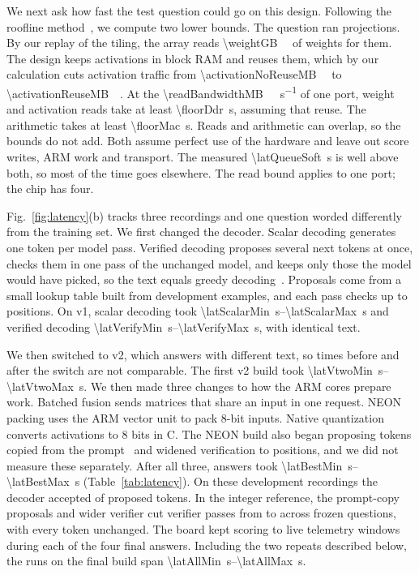 \documentclass[conference,10pt,letterpaper]{IEEEtran}
\newcommand{\seconds}[1]{\SI{#1}{\second}}
\newcommand{\secrange}[2]{\SIrange{#1}{#2}{\second}}
\newcommand{\eightbit}{\mbox{8-bit}}
\begin{document}
We next ask how fast the test question could go on this design. Following the roofline method~\cite{williams2009roofline}, we compute two lower bounds. The question ran \projectionsFloorCase{} projections. By our replay of the tiling, the array reads \SI{\weightGB}{\giga\byte} of weights for them. The design keeps activations in block RAM and reuses them, which by our calculation cuts activation traffic from \SI{\activationNoReuseMB}{\mega\byte} to \SI{\activationReuseMB}{\mega\byte}. At the \SI{\readBandwidthMB}{\mega\byte\per\second} of one port, weight and activation reads take at least \seconds{\floorDdr}, assuming that reuse. The arithmetic takes at least \seconds{\floorMac}. Reads and arithmetic can overlap, so the bounds do not add. Both assume perfect use of the hardware and leave out score writes, ARM work and transport. The measured \seconds{\latQueueSoft} is well above both, so most of the time goes elsewhere. The read bound applies to one port; the chip has four.

Fig.~\ref{fig:latency}(b) tracks three recordings and one question worded differently from the training set. We first changed the decoder. Scalar decoding generates one token per model pass. Verified decoding proposes several next tokens at once, checks them in one pass of the unchanged model, and keeps only those the model would have picked, so the text equals greedy decoding~\cite{leviathan2023speculative}. Proposals come from a small lookup table built from development examples, and each pass checks up to \verifyWidthOld{} positions. On v1, scalar decoding took \secrange{\latScalarMin}{\latScalarMax} and verified decoding \secrange{\latVerifyMin}{\latVerifyMax}, with identical text.

We then switched to v2, which answers with different text, so times before and after the switch are not comparable. The first v2 build took \secrange{\latVtwoMin}{\latVtwoMax}. We then made three changes to how the ARM cores prepare work. Batched fusion sends matrices that share an input in one request. NEON packing uses the ARM vector unit to pack \eightbit{} inputs. Native quantization converts activations to 8 bits in C. The NEON build also began proposing tokens copied from the prompt~\cite{saxena2023prompt} and widened verification to \verifyWidth{} positions, and we did not measure these separately. After all three, answers took \secrange{\latBestMin}{\latBestMax} (Table~\ref{tab:latency}). On these development recordings the decoder accepted \currentAccepted{} of \currentProposed{} proposed tokens. In the integer reference, the prompt-copy proposals and wider verifier cut verifier passes from \verifierBaselinePasses{} to \verifierPasses{} across \verifierQuestions{} frozen questions, with every token unchanged. The board kept scoring \liveMin{} to \liveMax{} live telemetry windows during each of the four final answers. Including the two repeats described below, the \latAllRuns{} runs on the final build span \secrange{\latAllMin}{\latAllMax}.
\end{document}

